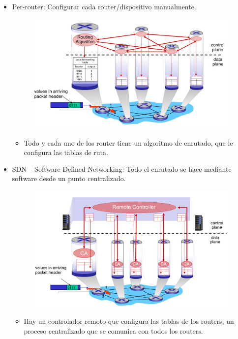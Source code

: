 \documentclass[12pt, twoside, openright]{report} %
\begin{document}
\begin{itemize}
	\item Per-router: Configurar cada router/dispositivo manualmente.
	      \begin{figure}[H]
		      {\includegraphics[scale=.3]{Untitled 20.png}}
	      \end{figure}
	      \begin{itemize}
		      \item Todo y cada uno de los router tiene un algoritmo de enrutado,
		            que le configura las tablas de ruta.
	      \end{itemize}
	      \pagebreak
	\item SDN -- Software Defined Networking: Todo el enrutado se hace
	      mediante software desde un punto centralizado.
	      \begin{figure}[H]
		      {\includegraphics[scale=.3]{Untitled 21.png}}
	      \end{figure}
	      \begin{itemize}
		      \item Hay un controlador remoto que configura las tablas de los
		            routers, un proceso centralizado que se comunica con todos los
		            routers.
	      \end{itemize}
\end{itemize}
\end{document}
